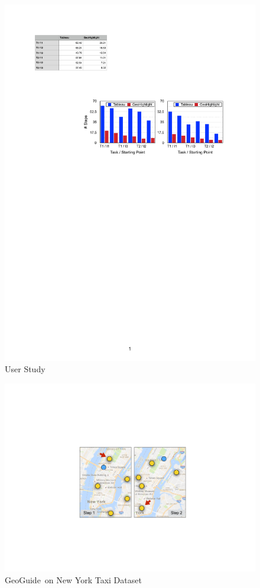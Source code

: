 \documentclass{vldb}
\newcommand{\framework}{{\sc GeoGuide}}
\begin{document}
\begin{figure}[t]
 \centering
 \includegraphics[width=\columnwidth]{figs/userstudy}
\caption{User Study}
\vspace{-5pt}
\label{fig:userstudy}
\end{figure}

\begin{figure}[t]
  \centering
  \includegraphics[width=\columnwidth]{figs/scn}
\caption{\framework\ on New York Taxi Dataset}
\label{fig:app}
\end{figure}
\end{document}
